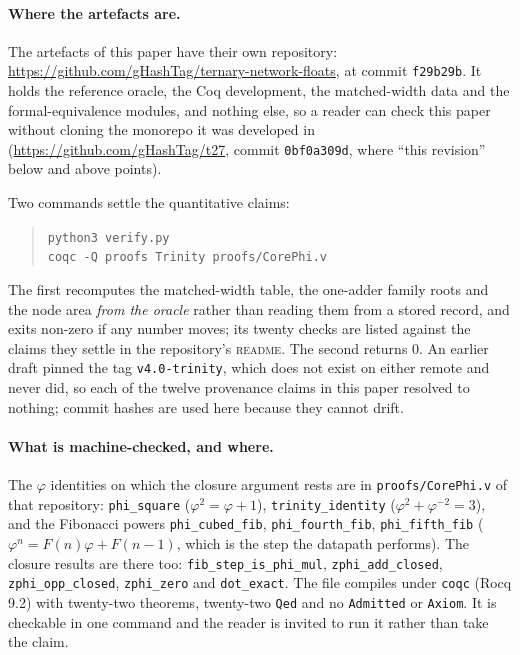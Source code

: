 \documentclass[11pt]{article}
\theoremstyle{definition}
\begin{document}
\paragraph{Where the artefacts are.} The artefacts of this paper have their own
repository: \url{https://github.com/gHashTag/ternary-network-floats}, at commit
\texttt{f29b29b}. It holds the reference oracle, the Coq development, the
matched-width data and the formal-equivalence modules, and nothing else, so a
reader can check this paper without cloning the monorepo it was developed in
(\url{https://github.com/gHashTag/t27}, commit \texttt{0bf0a309d}, where
``this revision'' below and above points).

Two commands settle the quantitative claims:

\begin{quote}
\texttt{python3 verify.py} \\
\texttt{coqc -Q proofs Trinity proofs/CorePhi.v}
\end{quote}

\noindent The first recomputes the matched-width table, the one-adder family
roots and the node area \emph{from the oracle} rather than reading them from a
stored record, and exits non-zero if any number moves; its twenty checks are
listed against the claims they settle in the repository's \textsc{readme}. The
second returns $0$. An earlier draft pinned the tag \texttt{v4.0-trinity},
which does not exist on either remote and never did, so each of the twelve
provenance claims in this paper resolved to nothing; commit hashes are used here
because they cannot drift.

\paragraph{What is machine-checked, and where.} The $\varphi$ identities on
which the closure argument rests are in \texttt{proofs/CorePhi.v} of that
repository: \texttt{phi\_square} ($\varphi^2=\varphi+1$),
\texttt{trinity\_identity} ($\varphi^2+\varphi^{-2}=3$), and the Fibonacci
powers \texttt{phi\_cubed\_fib}, \texttt{phi\_fourth\_fib},
\texttt{phi\_fifth\_fib} ($\varphi^n=F(n)\varphi+F(n-1)$, which is the step the
datapath performs). The closure results are there too:
\texttt{fib\_step\_is\_phi\_mul}, \texttt{zphi\_add\_closed},
\texttt{zphi\_opp\_closed}, \texttt{zphi\_zero} and \texttt{dot\_exact}. The
file compiles under \texttt{coqc} (Rocq 9.2) with twenty-two theorems,
twenty-two \texttt{Qed} and no \texttt{Admitted} or \texttt{Axiom}. It is checkable in one command and the reader is invited to run it rather
than take the claim.
\end{document}
